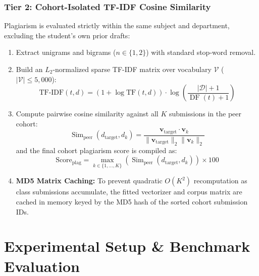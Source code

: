 \documentclass[journal]{IEEEtran}
\begin{document}
\subsubsection{Tier 2: Cohort-Isolated TF-IDF Cosine Similarity}
Plagiarism is evaluated strictly within the same subject and department, excluding the student's own prior drafts:
\begin{enumerate}
    \item Extract unigrams and bigrams ($n \in \{1, 2\}$) with standard stop-word removal.
    \item Build an $L_2$-normalized sparse TF-IDF matrix over vocabulary $\mathcal{V}$ ($|\mathcal{V}| \le 5,000$):
    \begin{equation}
        \text{TF-IDF}(t, d) = \left(1 + \log \text{TF}(t, d)\right) \cdot \log\left(\frac{|\mathcal{D}| + 1}{\operatorname{DF}(t) + 1}\right)
    \end{equation}
    \item Compute pairwise cosine similarity against all $K$ submissions in the peer cohort:
    \begin{equation}
        \operatorname{Sim}_{\text{peer}}(d_{\text{target}}, d_k) = \frac{\mathbf{v}_{\text{target}} \cdot \mathbf{v}_k}{\|\mathbf{v}_{\text{target}}\|_2 \|\mathbf{v}_k\|_2}
    \end{equation}
    and the final cohort plagiarism score is compiled as:
    \begin{equation}
        \text{Score}_{\text{plag}} = \max_{k \in \{1, \dots, K\}} \left(\operatorname{Sim}_{\text{peer}}(d_{\text{target}}, d_k)\right) \times 100
    \end{equation}
    \item \textbf{MD5 Matrix Caching:} To prevent quadratic $O(K^2)$ recomputation as class submissions accumulate, the fitted vectorizer and corpus matrix are cached in memory keyed by the MD5 hash of the sorted cohort submission IDs.
\end{enumerate}

\section{Experimental Setup \& Benchmark Evaluation}
\end{document}

